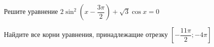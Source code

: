 \begin{ex}
	\begin{condition}
		\begin{enumcols}[label=\asbuk*)]
			\item Решите уравнение \( 2\sin^2 {\left(x - \dfrac{3\pi}{2}\right)} + \sqrt{3}\cos x = 0 \)
			\item Найдите все корни уравнения, принадлежащие отрезку \( \left[-\dfrac{11\pi}{2};-4\pi\right] \)
		\end{enumcols}
	\end{condition}
\end{ex}
